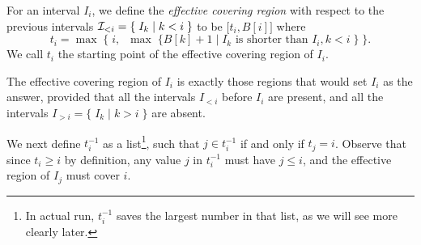 \documentclass[11pt]{llncs}
\newcommand{\remove}[1]{}
\newcommand\pred{\mathtt{pred}}
\begin{document}
\remove{
\begin{center}
$
\begin{array}{||c||c|c|c|c|c|c|c|c|c|c||}
\hline 
i           & 0 & 1 & 2 & 3 & 4 & 5 &  6 &  7  & 8   &  9 \\ \hline
B[i]      & 0 & 3 & 4 & 7 & 8 & 10 & 10 & 10 & 11 & 15 \\ \hline
\ell_i     & 0 & 3 & 3 & 5 & 5 & 6 & 5  & 4 & 4 & 7 \\ \hline \hline
\pred[i]   & - & - & - & 2 & 2 & 4 & 2 & 2 & 2 & 8 \\ \hline
t_i         & - & 1 & 2 & 5 & 5 & 9 & 6 & 7 & 8 & 12 \\ \hline
t_i^{-1} & - & 1 & 2 & - & - & 3, 4 & 6 & 7 & 8 & 5 \\ \hline 
\max\ t_i^{-1} & - & 1 & 2 & - & - & 4 & 6 & 7 & 8 & 5 \\ \hline \hline 
A[i]       & - & 1 & 2 & 2 & 2 & 4 & 6 & 7 & 8 & 8 \\ \hline 
\end{array}
$
\end{center}
}

\begin{definition}
For an interval $I_i$, we define the \emph{effective covering region} 
with respect to the previous intervals 
${\cal I}_{< i} = \{\; I_k \mid k < i \; \}$ to be $\bigl[t_i, B[i]\bigr]$ where 
\[
t_i = \max\;  \Big\{\; i,\;\; \max\; \{ B[k] + 1 \mid I_k 
\mbox{\ is shorter than\ } I_i, k < i \; \}\; \Big\}. 
\]
We call $t_i$ the starting point of the effective covering region of $I_i$.
\end{definition}
The effective covering region of $I_i$ is exactly those regions that
would set $I_i$ as the answer, provided that all the intervals $I_{<
  i}$ before $I_i$ are present, and all the intervals $I_{> i} = \{\;
I_k \mid k > i\; \}$ are absent.

\medskip

\noindent
We next define $t_i^{-1}$ as a list\footnote{In actual run,
  $t_i^{-1}$ saves the largest number in that list, as we will see
  more clearly later.}, such that $j \in
t_i^{-1}$ if and only if $t_j = i$. Observe that since $t_i \geq i$ by
definition, any value $j$ in $t_i^{-1}$ must have $j \leq i$, and the
effective region of $I_j$ must cover $i$.
\end{document}
